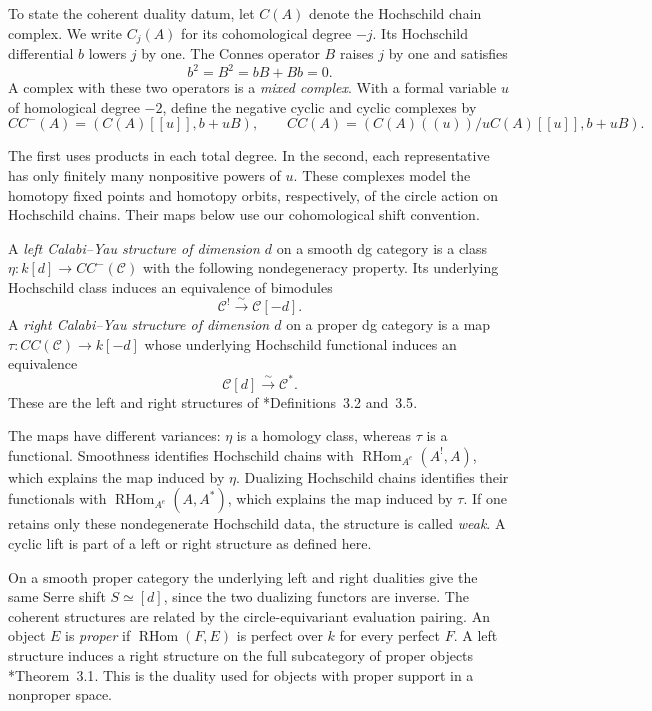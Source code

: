 To state the coherent duality datum, let $C(A)$ denote the Hochschild
chain complex. We write $C_j(A)$ for its cohomological degree $-j$.
Its Hochschild differential $b$ lowers $j$ by one. The Connes operator
$B$ raises $j$ by one and satisfies
\[
 b^2=B^2=bB+Bb=0.
\]
A complex with these two operators is a \emph{mixed complex}.
With a formal variable $u$ of homological degree $-2$, define the
negative cyclic and cyclic complexes by
\begin{equation}\label{cygeom:eq:cyclic-complexes}
 CC^-(A)=(C(A)[[u]],b+uB),\qquad
 CC(A)=(C(A)((u))/uC(A)[[u]],b+uB).
\end{equation}

The first uses products in each total degree. In the second, each
representative has only finitely many nonpositive powers of $u$.
These complexes model the homotopy fixed points and homotopy orbits,
respectively, of the circle action on Hochschild chains. Their maps below
use our cohomological shift convention.

\begin{definition}\label{cygeom:def:cy-structures}
A \emph{left Calabi--Yau structure of dimension $d$} on a smooth dg
category is a class $\eta:k[d]\to CC^-(\mathcal C)$ with the following
nondegeneracy property. Its underlying Hochschild class induces
an equivalence of bimodules
\[
 \mathcal C^!\xrightarrow{\sim}\mathcal C[-d].
\]
A \emph{right Calabi--Yau structure of dimension $d$} on a proper dg
category is a map
$\tau:CC(\mathcal C)\to k[-d]$ whose underlying Hochschild functional
induces an equivalence
\[
 \mathcal C[d]\xrightarrow{\sim}\mathcal C^*.
\]
These are the left and right structures of
\cite{cygeom:BD-relative}*{Definitions~3.2 and~3.5}.
\end{definition}

The maps have different variances: $\eta$ is a homology class, whereas
$\tau$ is a functional. Smoothness identifies Hochschild chains with
$\operatorname{RHom}_{A^e}(A^!,A)$, which explains the map induced by
$\eta$. Dualizing Hochschild chains identifies their functionals with
$\operatorname{RHom}_{A^e}(A,A^*)$, which explains the map induced by
$\tau$. If one retains only these nondegenerate Hochschild data, the
structure is called \emph{weak}. A cyclic lift is part of a left or
right structure as defined here.

On a smooth proper category the underlying left and right dualities
give the same Serre shift $S\simeq[d]$, since the two dualizing functors
are inverse. The coherent structures are related by the circle-equivariant
evaluation pairing. An object $E$ is \emph{proper} if
$\operatorname{RHom}(F,E)$ is perfect over $k$ for every perfect $F$.
A left structure induces a right structure on the full subcategory of
proper objects \cite{cygeom:BD-relative}*{Theorem~3.1}. This is the duality
used for objects with proper support in a nonproper space.

